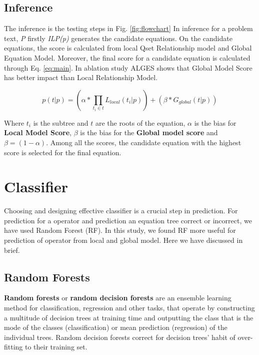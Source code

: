 \documentclass[document.tex]{subfiles}
\begin{document}
\subsection{Inference}
The inference is the testing steps in Fig. \ref{fig:flowchart} In inference for a problem text, \textit{P} firstly \textit{ILP(p)} generates the candidate equations. On the candidate equations, the score is calculated from local Qset Relationship model and Global Equation Model. Moreover, the final score for a candidate equation is calculated through Eq. \ref{eq:main}. In ablation study ALGES shows that Global Model Score has better impact than Local Relationship Model.

\begin{equation}
	p(t|p) = (\alpha * \prod_{t_i \in t} L_{local}(t_i | p) ) + (\beta * G_{global}(t|p))
	\label{eq:main}
\end{equation}

Where $t_i$ is the subtree and $t$ are the roots of the equation, $\alpha$ is the bias for \textbf{Local Model Score}, $\beta$ is the bias for the \textbf{Global model score} and $\beta = (1 - \alpha)$. Among all the scores, the candidate equation with the highest score is selected for the final equation.

\section{Classifier} Choosing and designing effective classifier is a crucial step in prediction. For prediction for a operator and prediction an equation tree correct or incorrect, we have used Random Forest (RF). In this study, we found RF more useful for prediction of operator from local and global model. Here we have discussed in brief.

\subsection{Random Forests}
\textbf{Random forests} or \textbf{random decision forests} are an ensemble learning method for classification, regression and other tasks, that operate by constructing a multitude of decision trees at training time and outputting the class that is the mode of the classes (classification) or mean prediction (regression) of the individual trees. Random decision forests correct for decision trees' habit of over-fitting to their training set.
\end{document}
